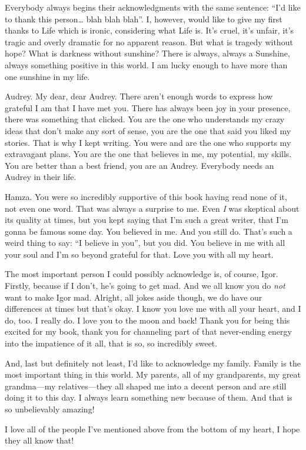 Everybody always begins their acknowledgments with the same sentence: “I'd like to thank this person… blah blah blah”. I, however, would like to give my first thanks to Life which is ironic, considering what Life is. It's cruel, it's unfair, it's tragic and overly dramatic for no apparent reason. But what is tragedy without hope? What is darkness without sunshine? There is always, always a Sunshine, always something positive in this world. I am lucky enough to have more than one sunshine in my life. 

Audrey. My dear, dear Audrey. There aren't enough words to express how grateful I am that I have met you. There has always been joy in your presence, there was something that clicked. You are the one who understands my crazy ideas that don't make any sort of sense, you are the one that said you liked my stories. That is why I kept writing. You were and are the one who supports my extravagant plans. You are the one that believes in me, my potential, my skills. You are better than a best friend, you are an Audrey. Everybody needs an Audrey in their life.

Hamza. You were so incredibly supportive of this book having read none of it, not even one word. That was always a surprise to me. Even \textit{I} was skeptical about its quality at times, but you kept saying that I'm such a great writer, that I'm gonna be famous some day. You believed in me. And you still do. That's such a weird thing to say: “I believe in you”, but you did. You believe in me with all your soul and I'm so beyond grateful for that. Love you with all my heart.

The most important person I could possibly acknowledge is, of course, Igor. Firstly, because if I don't, he's going to get mad. And we all know you do \textit{not} want to make Igor mad. Alright, all jokes aside though, we do have our differences at times but that's okay. I know you love me with all your heart, and I do, too. I really do. I love you to the moon and back! Thank you for being this excited for my book, thank you for channeling part of that never-ending energy into the impatience of it all, that is so, so incredibly sweet.

And, last but definitely not least, I'd like to acknowledge my family. Family is the most important thing in this world. My parents, all of my grandparents, my great grandma—my relatives—they all shaped me into a decent person and are still doing it to this day. I always learn something new because of them. And that is so unbelievably amazing!

I love all of the people I've mentioned above from the bottom of my heart, I hope they all know that!